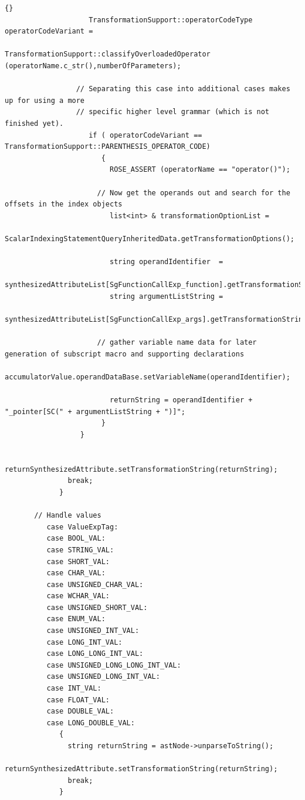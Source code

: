 \documentclass[10pt]{article}
\begin{document}
{\begin{lstlisting}{}
                    TransformationSupport::operatorCodeType operatorCodeVariant =
                         TransformationSupport::classifyOverloadedOperator (operatorName.c_str(),numberOfParameters);

                 // Separating this case into additional cases makes up for using a more
                 // specific higher level grammar (which is not finished yet).
                    if ( operatorCodeVariant == TransformationSupport::PARENTHESIS_OPERATOR_CODE)
                       {
                         ROSE_ASSERT (operatorName == "operator()");

                      // Now get the operands out and search for the offsets in the index objects
                         list<int> & transformationOptionList =
                              ScalarIndexingStatementQueryInheritedData.getTransformationOptions();

                         string operandIdentifier  =
                            synthesizedAttributeList[SgFunctionCallExp_function].getTransformationString();
                         string argumentListString =
                            synthesizedAttributeList[SgFunctionCallExp_args].getTransformationString();

                      // gather variable name data for later generation of subscript macro and supporting declarations
                         accumulatorValue.operandDataBase.setVariableName(operandIdentifier);

                         returnString = operandIdentifier + "_pointer[SC(" + argumentListString + ")]";
                       }
                  }

               returnSynthesizedAttribute.setTransformationString(returnString);
               break;
             }

       // Handle values
          case ValueExpTag:
          case BOOL_VAL:
          case STRING_VAL:
          case SHORT_VAL:
          case CHAR_VAL:
          case UNSIGNED_CHAR_VAL:
          case WCHAR_VAL:
          case UNSIGNED_SHORT_VAL:
          case ENUM_VAL:
          case UNSIGNED_INT_VAL:
          case LONG_INT_VAL:
          case LONG_LONG_INT_VAL:
          case UNSIGNED_LONG_LONG_INT_VAL:
          case UNSIGNED_LONG_INT_VAL:
          case INT_VAL:
          case FLOAT_VAL:
          case DOUBLE_VAL:
          case LONG_DOUBLE_VAL:
             {
               string returnString = astNode->unparseToString();
               returnSynthesizedAttribute.setTransformationString(returnString);
               break;
             }


\end{lstlisting}}
\end{document}
